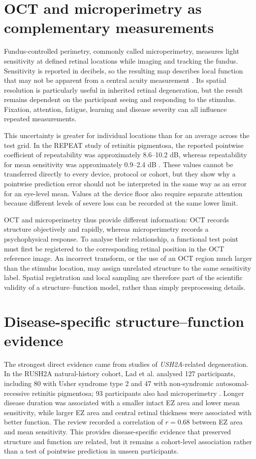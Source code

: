 \section{OCT and microperimetry as complementary measurements}

Fundus-controlled perimetry, commonly called microperimetry, measures light sensitivity at defined retinal locations while imaging and tracking the fundus. Sensitivity is reported in decibels, so the resulting map describes local function that may not be apparent from a central acuity measurement \cite{Pfau2021Microperimetry}. Its spatial resolution is particularly useful in inherited retinal degeneration, but the result remains dependent on the participant seeing and responding to the stimulus. Fixation, attention, fatigue, learning and disease severity can all influence repeated measurements.

This uncertainty is greater for individual locations than for an average across the test grid. In the REPEAT study of retinitis pigmentosa, the reported pointwise coefficient of repeatability was approximately 8.6--10.2 dB, whereas repeatability for mean sensitivity was approximately 0.9--2.4 dB \cite{Karuntu2025}. These values cannot be transferred directly to every device, protocol or cohort, but they show why a pointwise prediction error should not be interpreted in the same way as an error for an eye-level mean. Values at the device floor also require separate attention because different levels of severe loss can be recorded at the same lower limit.

OCT and microperimetry thus provide different information: OCT records structure objectively and rapidly, whereas microperimetry records a psychophysical response. To analyse their relationship, a functional test point must first be registered to the corresponding retinal position in the OCT reference image. An incorrect transform, or the use of an OCT region much larger than the stimulus location, may assign unrelated structure to the same sensitivity label. Spatial registration and local sampling are therefore part of the scientific validity of a structure--function model, rather than simply preprocessing details.

\section{Disease-specific structure--function evidence}

The strongest direct evidence came from studies of \textit{USH2A}-related degeneration. In the RUSH2A natural-history cohort, Lad et al. analysed 127 participants, including 80 with Usher syndrome type 2 and 47 with non-syndromic autosomal-recessive retinitis pigmentosa; 93 participants also had microperimetry \cite{Lad2022}. Longer disease duration was associated with a smaller intact EZ area and lower mean sensitivity, while larger EZ area and central retinal thickness were associated with better function. The review recorded a correlation of $r=0.68$ between EZ area and mean sensitivity. This provides disease-specific evidence that preserved structure and function are related, but it remains a cohort-level association rather than a test of pointwise prediction in unseen participants.

